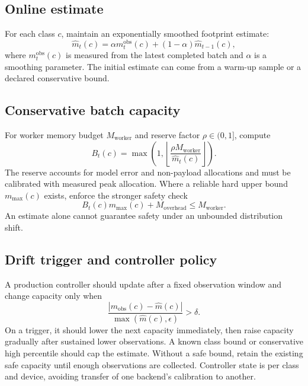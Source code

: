 \documentclass[11pt]{article}
\begin{document}
\subsection{Online estimate}
For each class $c$, maintain an exponentially smoothed footprint estimate:
\begin{equation}
\hat m_t(c)=\alpha m^{\mathrm{obs}}_t(c)+(1-\alpha)\hat m_{t-1}(c),
\end{equation}
where $m^{\mathrm{obs}}_t(c)$ is measured from the latest completed batch and $\alpha$ is a smoothing parameter. The initial estimate can come from a warm-up sample or a declared conservative bound.

\subsection{Conservative batch capacity}
For worker memory budget $M_{\mathrm{worker}}$ and reserve factor $\rho\in(0,1]$, compute
\begin{equation}
B_t(c)=\max\left(1,\left\lfloor\frac{\rho M_{\mathrm{worker}}}{\hat m_t(c)}\right\rfloor\right).
\end{equation}
The reserve accounts for model error and non-payload allocations and must be calibrated with measured peak allocation. Where a reliable hard upper bound $m_{\max}(c)$ exists, enforce the stronger safety check
\begin{equation}
B_t(c)m_{\max}(c)+M_{\mathrm{overhead}}\le M_{\mathrm{worker}}.
\end{equation}
An estimate alone cannot guarantee safety under an unbounded distribution shift.

\subsection{Drift trigger and controller policy}
A production controller should update after a fixed observation window and change capacity only when
\begin{equation}
\frac{|m_{\mathrm{obs}}(c)-\hat m(c)|}{\max(\hat m(c),\epsilon)}>\delta.
\end{equation}
On a trigger, it should lower the next capacity immediately, then raise capacity gradually after sustained lower observations. A known class bound or conservative high percentile should cap the estimate. Without a safe bound, retain the existing safe capacity until enough observations are collected. Controller state is per class and device, avoiding transfer of one backend's calibration to another.
\end{document}
